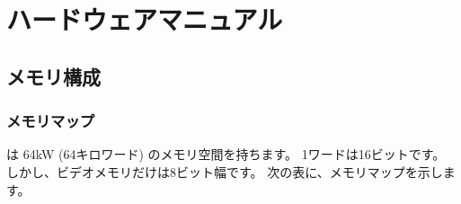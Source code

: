 % 
%
\chapter{\tac ハードウェアマニュアル}

\section{メモリ構成}

\subsection{メモリマップ}
\label{app:memmap}

\tac は 64kW (64キロワード) のメモリ空間を持ちます。
1ワードは16ビットです。
しかし、ビデオメモリだけは8ビット幅です。
次の表に、メモリマップを示します。

